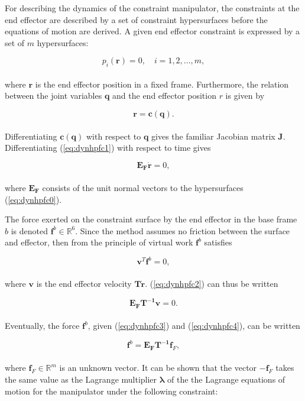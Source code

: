 For describing the dynamics of the constraint manipulator, the constraints at the end effector are described by a set of constraint hypersurfaces before the equations of motion are derived. A given end effector constraint is expressed by a set of $m$ hypersurfaces:

\begin{equation}\label{eq:dynhpfc0}
    p_i(\mathbf{r}) = 0, \quad i = 1, 2, ..., m,
\end{equation}
\\
where $\mathbf{r}$ is the end effector position in a fixed frame. Furthermore, the relation between the joint variables $\mathbf{q}$ and the end effector position $r$ is given by

\begin{equation}\label{eq:dynhpfc1}
    \mathbf{r = c(q)}.
\end{equation}
\\
Differentiating $\mathbf{c(q)}$ with respect to $\mathbf{q}$ gives the familiar Jacobian matrix $\mathbf{J}$.
Differentiating (\ref{eq:dynhpfc1}) with respect to time gives

\begin{equation}\label{eq:dynhpfc2}
    \mathbf{E_F \dot{r}} = 0,
\end{equation}
\\
where $\mathbf{E_F}$ consists of the unit normal vectors to the hypersurfaces (\ref{eq:dynhpfc0}).

The force exerted on the constraint surface by the end effector in the base frame $b$ is denoted $\mathbf{f}^b \in \mathbb{R}^6$. Since the method assumes no friction between the surface and effector, then from the principle of virtual work $\mathbf{f}^b$ satisfies

\begin{equation}\label{eq:dynhpfc3}
    \mathbf{v}^T \mathbf{f}^b = 0,
\end{equation}
\\
where $\mathbf{v}$ is the end effector velocity $\mathbf{T\dot{r}}$. (\ref{eq:dynhpfc2}) can thus be written

\begin{equation}\label{eq:dynhpfc4}
    \mathbf{E_F T^{-1} v} = 0.    
\end{equation}
\\
Eventually, the force $\mathbf{f}^b$, given (\ref{eq:dynhpfc3}) and (\ref{eq:dynhpfc4}), can be written 

\begin{equation}
    \mathbf{f}^b = \mathbf{E_F T^{-1}} \mathbf{f}_F,
\end{equation}
\\
where $\mathbf{f}_F \in \mathbb{R}^m$ is an unknown vector. It can be shown that the vector $\mathbf{-f}_F$ takes the same value as the Lagrange multiplier $\boldsymbol{\lambda}$ of the the Lagrange equations of motion for the manipulator under the following constraint:


